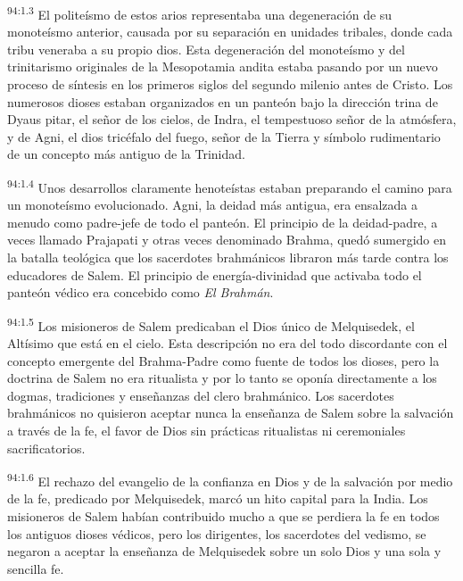 \par
\textsuperscript{94:1.3} El politeísmo de estos arios representaba una degeneración de su monoteísmo anterior, causada por su separación en unidades tribales, donde cada tribu veneraba a su propio dios. Esta degeneración del monoteísmo y del trinitarismo originales de la Mesopotamia andita estaba pasando por un nuevo proceso de síntesis en los primeros siglos del segundo milenio antes de Cristo. Los numerosos dioses estaban organizados en un panteón bajo la dirección trina de Dyaus pitar, el señor de los cielos, de Indra, el tempestuoso señor de la atmósfera, y de Agni, el dios tricéfalo del fuego, señor de la Tierra y símbolo rudimentario de un concepto más antiguo de la Trinidad.

\par
\textsuperscript{94:1.4} Unos desarrollos claramente henoteístas estaban preparando el camino para un monoteísmo evolucionado. Agni, la deidad más antigua, era ensalzada a menudo como padre-jefe de todo el panteón. El principio de la deidad-padre, a veces llamado Prajapati y otras veces denominado Brahma, quedó sumergido en la batalla teológica que los sacerdotes brahmánicos libraron más tarde contra los educadores de Salem. El principio de energía-divinidad que activaba todo el panteón védico era concebido como \textit{El Brahmán}.

\par
\textsuperscript{94:1.5} Los misioneros de Salem predicaban el Dios único de Melquisedek, el Altísimo que está en el cielo. Esta descripción no era del todo discordante con el concepto emergente del Brahma-Padre como fuente de todos los dioses, pero la doctrina de Salem no era ritualista y por lo tanto se oponía directamente a los dogmas, tradiciones y enseñanzas del clero brahmánico. Los sacerdotes brahmánicos no quisieron aceptar nunca la enseñanza de Salem sobre la salvación a través de la fe, el favor de Dios sin prácticas ritualistas ni ceremoniales sacrificatorios.

\par
\textsuperscript{94:1.6} El rechazo del evangelio de la confianza en Dios y de la salvación por medio de la fe, predicado por Melquisedek, marcó un hito capital para la India. Los misioneros de Salem habían contribuido mucho a que se perdiera la fe en todos los antiguos dioses védicos, pero los dirigentes, los sacerdotes del vedismo, se negaron a aceptar la enseñanza de Melquisedek sobre un solo Dios y una sola y sencilla fe.

